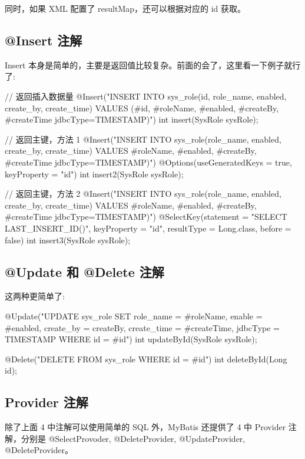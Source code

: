 同时，如果 XML 配置了 resultMap，还可以根据对应的 id 获取。

\subsection{@Insert 注解}

Insert 本身是简单的，主要是返回值比较复杂。前面的会了，这里看一下例子就行了:

\begin{Java}
// 返回插入数据量
@Insert("INSERT INTO sys_role(id, role_name, enabled, create_by, create_time) VALUES (#{id}, #{roleName}, #{enabled}, #{createBy}, #{createTime jdbcType=TIMESTAMP})")
int insert(SysRole sysRole);

// 返回主键，方法 1
@Insert("INSERT INTO sys_role(role_name, enabled, create_by, create_time) VALUES #{roleName}, #{enabled}, #{createBy}, #{createTime jdbcType=TIMESTAMP})")
@Options(useGeneratedKeys = true, keyProperty = "id")
int insert2(SysRole sysRole);

// 返回主键，方法 2
@Insert("INSERT INTO sys_role(role_name, enabled, create_by, create_time) VALUES #{roleName}, #{enabled}, #{createBy}, #{createTime jdbcType=TIMESTAMP})")
@SelectKey(statement = "SELECT LAST_INSERT_ID()", keyProperty = "id", resultType = Long.class, before = false)
int insert3(SysRole sysRole);
\end{Java}

\subsection{@Update 和 @Delete 注解}

这两种更简单了:

\begin{Java}
@Update("UPDATE sys_role SET role_name = #{roleName}, enable = #{enabled}, create_by = {createBy}, create_time = #{createTime, jdbcType = TIMESTAMP} WHERE id = #{id}")
int updateById(SysRole sysRole);

@Delete("DELETE FROM sys_role WHERE id = #{id}")
int deleteById(Long id);
\end{Java}

\subsection{Provider 注解}

除了上面 4 中注解可以使用简单的 SQL 外，MyBatis 还提供了 4 中 Provider 注解，分别是 @SelectProvoder, @DeleteProvider, @UpdateProvider, @DeleteProvider。


